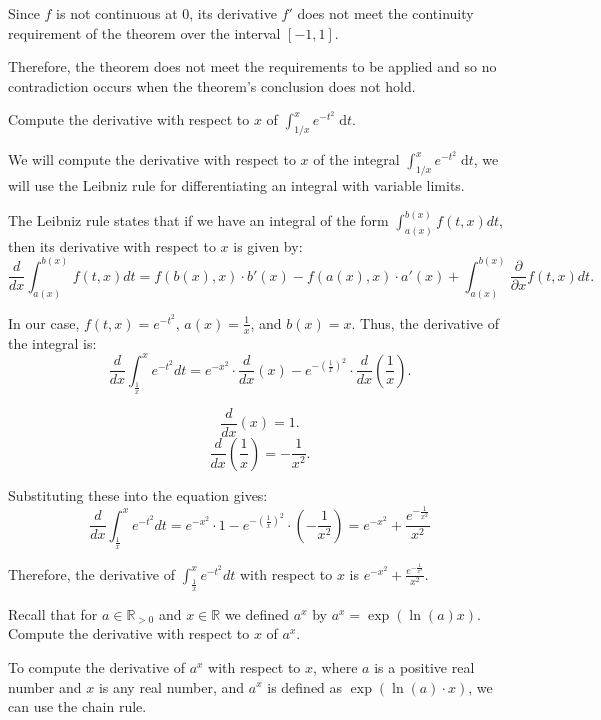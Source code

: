 \documentclass[answers]{exam}
\theoremstyle{remark}
\theoremstyle{definition}
\newcommand{\RR}{\mathbb{R}}
\newcommand{\dt}{\;\mathrm{d}t}
\begin{document}
\begin{questions}
\begin{solution}
Since $f$ is not continuous at $0$, its derivative $f'$ does not meet the continuity
requirement of the theorem over the interval $[-1, 1]$.

Therefore, the theorem does not meet the requirements to be applied and so no
contradiction occurs when the theorem's conclusion does not hold.

\end{solution}


\question[4] Compute the derivative with respect to $x$ of $\int_{1/x}^x e^{-t^2} \dt$.

\begin{solution}

We will compute the derivative with respect to $x$ of the integral $\int_{1/x}^x e^{-t^2} \dt$,
we will use the Leibniz rule for differentiating an integral with variable limits.

The Leibniz rule states that if we have an integral of the form $\int_{a(x)}^{b(x)} f(t, x) dt$,
then its derivative with respect to $x$ is given by:
\[\frac{d}{dx} \int_{a(x)}^{b(x)} f(t, x) dt = f(b(x), x) \cdot b'(x) - f(a(x), x) \cdot a'(x) + \int_{a(x)}^{b(x)} \frac{\partial}{\partial x} f(t, x) dt.\]

In our case, $f(t, x) = e^{-t^2}$, $a(x) = \frac{1}{x}$, and $b(x) = x$. Thus, the derivative
of the integral is:
\[\frac{d}{dx} \int_{\frac{1}{x}}^{x} e^{-t^2} dt = e^{-x^2} \cdot \frac{d}{dx}(x) - e^{-(\frac{1}{x})^2} \cdot \frac{d}{dx}\left(\frac{1}{x}\right).\]

\[\frac{d}{dx}(x) = 1.\]
\[\frac{d}{dx}(\frac{1}{x}) = -\frac{1}{x^2}.\]

Substituting these into the equation gives:
\[\frac{d}{dx} \int_{\frac{1}{x}}^{x} e^{-t^2} dt = e^{-x^2} \cdot 1 - e^{-(\frac{1}{x})^2} \cdot \left(-\frac{1}{x^2}\right) = e^{-x^2} + \frac{e^{-\frac{1}{x^2}}}{x^2}\]

Therefore, the derivative of $\int_{\frac{1}{x}}^{x} e^{-t^2} dt$ with respect to $x$
is $e^{-x^2} + \frac{e^{-\frac{1}{x^2}}}{x^2}$.

\end{solution}


\question[4] Recall that for $a \in \RR_{>0}$ and $x \in \RR$ we defined $a^x$ by $a^x=\exp(\ln(a) x)$. Compute the derivative with respect to $x$ of $a^x$.

\begin{solution}

To compute the derivative of $a^x$ with respect to $x$, where $a$ is a positive real
number and $x$ is any real number, and $a^x$ is defined as $\exp(\ln(a) \cdot x)$,
we can use the chain rule.


\end{solution}
\end{questions}
\end{document}
